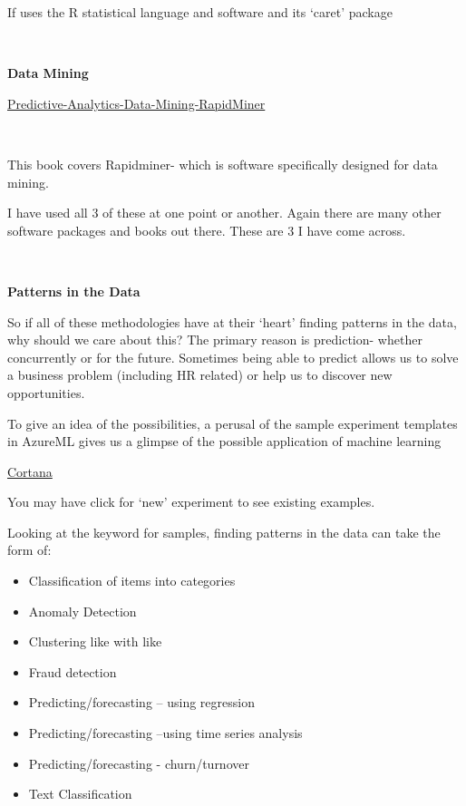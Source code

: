 \documentclass[
]{article}
\begin{document}
If uses the R statistical language and software and its `caret' package

~

\textbf{Data Mining}

\href{http://www.amazon.ca/Predictive-Analytics-Data-Mining-RapidMiner/dp/0128014601/ref=sr_1_2?s=books&ie=UTF8&qid=1445460564&sr=1-2&keywords=rapidminer}{Predictive-Analytics-Data-Mining-RapidMiner}

~

This book covers Rapidminer- which is software specifically designed for
data mining.

I have used all 3 of these at one point or another. Again there are many
other software packages and books out there. These are 3 I have come
across.

~

\textbf{Patterns in the Data}

So if all of these methodologies have at their `heart' finding patterns
in the data, why should we care about this? The primary reason is
prediction- whether concurrently or for the future. Sometimes being able
to predict allows us to solve a business problem (including HR related)
or help us to discover new opportunities.

To give an idea of the possibilities, a perusal of the sample experiment
templates in AzureML gives us a glimpse of the possible application of
machine learning

\href{http://gallery.cortanaanalytics.com/browse/?categories=\%5b\%22Experiment\%22\%5d&examples=true}{Cortana}

You may have click for `new' experiment to see existing examples.

Looking at the keyword for samples, finding patterns in the data can
take the form of:

\begin{itemize}
\item
  Classification of items into categories
\item
  Anomaly Detection
\item
  Clustering like with like
\item
  Fraud detection
\item
  Predicting/forecasting -- using regression
\item
  Predicting/forecasting --using time series analysis
\item
  Predicting/forecasting - churn/turnover
\item
  Text Classification
\end{itemize}
\end{document}
